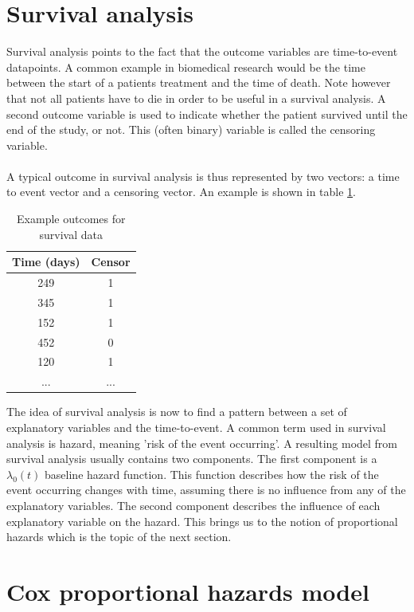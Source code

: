 \section{Survival analysis}
\label{sec:cox-survival-analysis}
Survival analysis points to the fact that the outcome variables are time-to-event datapoints. A common example in biomedical research would be the time between the start of a patients treatment and the time of death. Note however that not all patients have to die in order to be useful in a survival analysis. A second outcome variable is used to indicate whether the patient survived until the end of the study, or not. This (often binary) variable is called the censoring variable. \\ \\
A typical outcome in survival analysis is thus represented by two vectors: a time to event vector and a censoring vector. An example is shown in table \ref{tab:cox-example-outcome}.
\begin{table}
	\centering
	\begin{tabular}{cc}
		\toprule
		Time (days) & Censor\\
		\midrule
		249 & 1 \\
		345 & 1 \\
		152 & 1 \\
		452 & 0 \\
		120 & 1 \\
		... & ... \\
		\bottomrule
	\end{tabular}
	\caption{Example outcomes for survival data}
	\label{tab:cox-example-outcome}
\end{table}
The idea of survival analysis is now to find a pattern between a set of explanatory variables and the time-to-event. A common term used in survival analysis is hazard, meaning 'risk of the event occurring'. A resulting model from survival analysis usually contains two components. The first component is a $\lambda_{0}(t)$ baseline hazard function. This function describes how the risk of the event occurring changes with time, assuming there is no influence from any of the explanatory variables. The second component describes the influence of each explanatory variable on the hazard. This brings us to the notion of proportional hazards which is the topic of the next section.

\section{Cox proportional hazards model}
\label{sec:cox-proportional-hazards-model}
